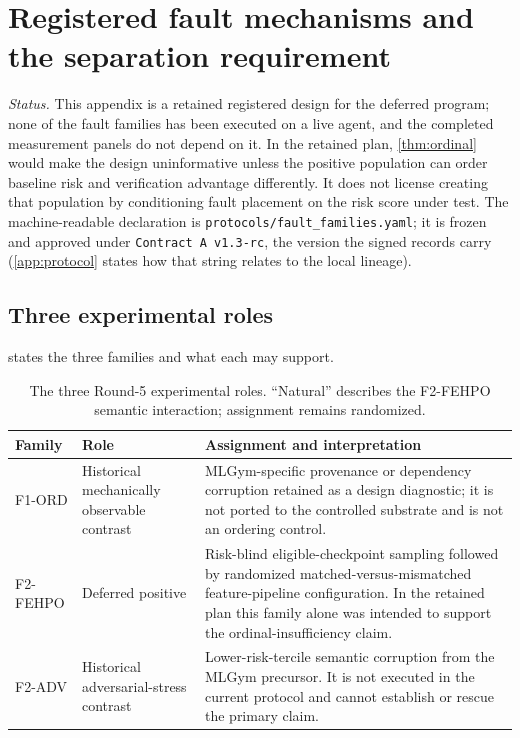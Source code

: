 \section{Registered fault mechanisms and the separation requirement}
\label{app:faults}

\emph{Status.} This appendix is a retained registered design for the deferred
program; none of the fault families has been executed on a live agent, and the
completed measurement panels do not depend on it.  In the retained plan,
\cref{thm:ordinal} would make the design uninformative unless the positive
population can order baseline risk and verification advantage differently.  It
does not license creating that population by conditioning fault placement on the
risk score under test.  The machine-readable declaration is
\texttt{protocols/fault\_families.yaml}; it is frozen and approved under
\texttt{Contract A v1.3-rc}, the version the signed records carry
(\cref{app:protocol} states how that string relates to the local lineage).

\subsection{Three experimental roles}

 states the three families and what each may support.

\begin{table}[H]
\centering\small
\begin{tabular}{@{}lp{3.1cm}p{6.6cm}@{}}
\toprule
Family & Role & Assignment and interpretation \\
\midrule
F1-ORD & Historical mechanically observable contrast & MLGym-specific provenance or dependency corruption retained as a design diagnostic; it is not ported to the controlled substrate and is not an ordering control. \\
F2-FEHPO & Deferred positive & Risk-blind eligible-checkpoint sampling followed by randomized matched-versus-mismatched feature-pipeline configuration.  In the retained plan this family alone was intended to support the ordinal-insufficiency claim. \\
F2-ADV & Historical adversarial-stress contrast & Lower-risk-tercile semantic corruption from the MLGym precursor.  It is not executed in the current protocol and cannot establish or rescue the primary claim. \\
\bottomrule
\end{tabular}
\caption{The three Round-5 experimental roles.  ``Natural'' describes the
F2-FEHPO semantic interaction; assignment remains randomized.}
\label{tab:fault-roles}
\end{table}

